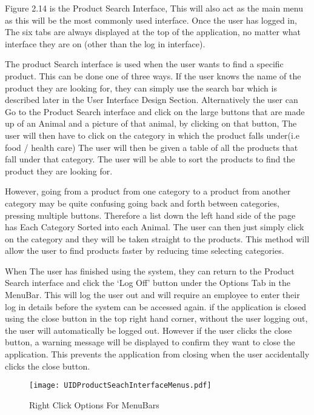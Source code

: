 Figure 2.14 is the Product Search Interface, This will also act as the main menu as this will be the most commonly used interface. Once the user has logged in, The six tabs are always displayed at the top of the application, no matter what interface they are on (other than the log in interface). \par

The product Search interface is used when the user wants to find a specific product. This can be done one of three ways. If the user knows the name of the product they are looking for, they can simply use the search bar which is described later in the User Interface Design Section. Alternatively the user can Go to the Product Search interface and click on the large buttons that are made up of an Animal and a picture of that animal, by clicking on that button, The user will then have to click on the category in which the product falls under(i.e food / health care) The user will then be given a table of all the products that fall under that category. The user will be able to sort the products to find the product they are looking for. \par

However, going from a product from one category to a product from another category may be quite confusing going back and forth between categories, pressing multiple buttons. Therefore a list down the left hand side of the page has Each Category Sorted into each Animal. The user can then just simply click on the category and they will be taken straight to the products. This method will allow the user to find products faster by reducing time selecting categories. \par

When The user has finished using the system, they can return to the Product Search interface and click the `Log Off' button under the Options Tab in the MenuBar. This will log the user out and will require an employee to enter their log in details before the system can be accessed again. if the application is closed using the close button in the top right hand corner, without the user logging out, the user will automatically be logged out. However if the user clicks the close button, a warning message will be displayed to confirm they want to close the application. This prevents the application from closing when the user accidentally clicks the close button. \par

\begin{figure}[H]
\caption{Right Click Options For MenuBars} \label{fig:Right Click Options For MenuBars}
\hfill\texttt{[image: UIDProductSeachInterfaceMenus.pdf]}\hspace*{\fill}
\end{figure}

